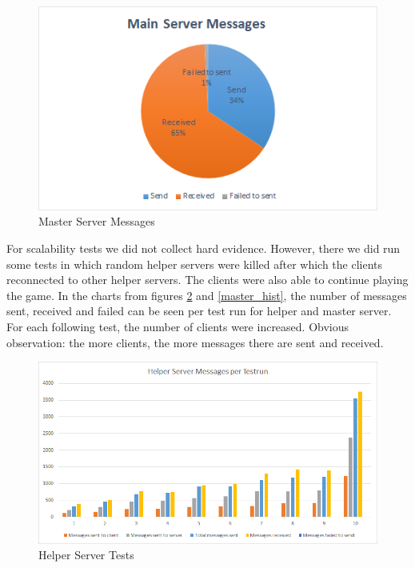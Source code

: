 \begin{figure}[ht]
\centering
\includegraphics[scale=0.8]{images/master_pie.png}
\caption{Master Server Messages}
\label{master_pie}
\end{figure}

For scalability tests we did not collect hard evidence. 
However, there we did run some tests in which random helper servers were killed after which the clients reconnected to other helper servers.
The clients were also able to continue playing the game.
In the charts from figures \ref{helper_hist} and \ref{master_hist}, the number of messages sent, received and failed can be seen per test run for helper and master server.
For each following test, the number of clients were increased. 
Obvious observation: the more clients, the more messages there are sent and received.

\begin{figure}[ht]
\centering
\includegraphics[scale=0.8]{images/helper_hist.png}
\caption{Helper Server Tests}
\label{helper_hist}
\end{figure}

